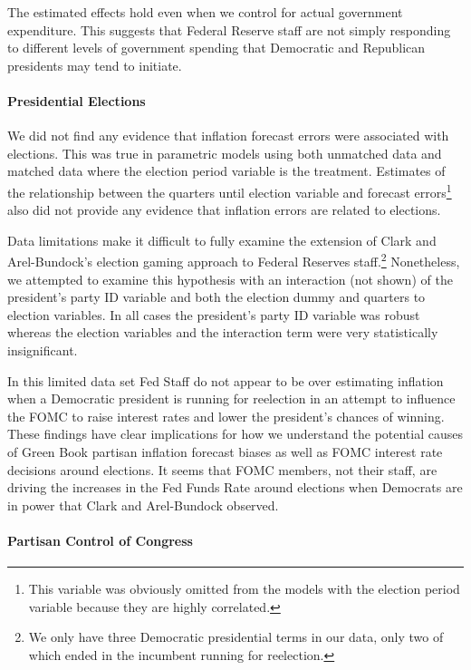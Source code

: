 \documentclass[a4paper]{article}\usepackage{graphicx, color}
\begin{document}
The estimated effects hold even when we control for actual government expenditure. This suggests that Federal Reserve staff are not simply responding to different levels of government spending that Democratic and Republican presidents may tend to initiate.

\paragraph{Presidential Elections}

We did not find any evidence that inflation forecast errors were associated with elections. This was true in parametric models using both unmatched data and matched data where the election period variable is the treatment. Estimates of the relationship between the quarters until election variable and forecast errors\footnote{This variable was obviously omitted from the models with the election period variable because they are highly correlated.} also did not provide any evidence that inflation errors are related to elections. 

Data limitations make it difficult to fully examine the extension of Clark and Arel-Bundock's \citeyearpar{Clark2011} election gaming approach to Federal Reserves staff.\footnote{We only have three Democratic presidential terms in our data, only two of which ended in the incumbent running for reelection.} Nonetheless, we attempted to examine this hypothesis with an interaction (not shown) of the president's party ID variable and both the election dummy and quarters to election variables. In all cases the president's party ID variable was robust whereas the election variables and the interaction term were very statistically insignificant. 

In this limited data set Fed Staff do not appear to be over estimating inflation when a Democratic president is running for reelection in an attempt to influence the FOMC to raise interest rates and lower the president's chances of winning. These findings have clear implications for how we understand the potential causes of Green Book partisan inflation forecast biases as well as FOMC interest rate decisions around elections. It seems that FOMC members, not their staff, are driving the increases in the Fed Funds Rate around elections when Democrats are in power that Clark and Arel-Bundock observed. 

\paragraph{Partisan Control of Congress}
\end{document}

